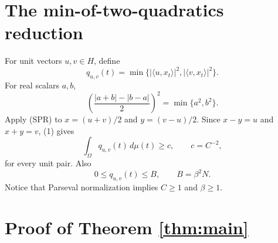 \documentclass[11pt]{article}
\newcommand{\ip}[2]{\langle #1,#2\rangle}
\begin{document}
\section{The min-of-two-quadratics reduction}

For unit vectors $u,v\in H$, define
\[
 q_{u,v}(t)=
 \min\{|\ip{u}{x_t}|^2,|\ip{v}{x_t}|^2\}.
\]
For real scalars $a,b$,
\[
 \left(\frac{|a+b|-|b-a|}{2}\right)^2=\min\{a^2,b^2\}.          \tag{1}
\]
Apply (SPR) to $x=(u+v)/2$ and $y=(v-u)/2$.  Since
$x-y=u$ and $x+y=v$, (1) gives
\[
 \int_\Omega q_{u,v}(t)\,d\mu(t)\ge c,\qquad c=C^{-2},          \tag{2}
\]
for every unit pair.  Also
\[
 0\le q_{u,v}(t)\le B,\qquad B=\beta^2N.                       \tag{3}
\]
Notice that Parseval normalization implies $C\ge1$ and $\beta\ge1$.

\section{Proof of Theorem \ref{thm:main}}
\end{document}
